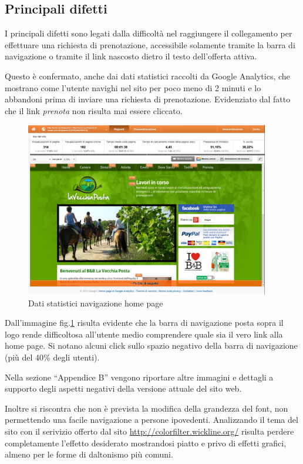 \documentclass[a4paper,12pt,hidelinks]{report}
\begin{document}
\subsection{Principali difetti}
  I principali difetti sono legati dalla difficoltà nel raggiungere il collegamento per effettuare una richiesta di prenotazione, accessibile 
  solamente tramite la barra di navigazione o tramite il link nascosto dietro il testo dell'offerta attiva.
  \par Questo è confermato, anche dai dati statistici raccolti da Google Analytics, che mostrano come l'utente navighi nel sito per poco meno di 2 minuti e 
  lo abbandoni prima di inviare una richiesta di prenotazione. Evidenziato dal fatto che il link \textit{prenota} non risulta mai essere cliccato.
  \begin{figure}[h!]%
    \includegraphics[width=0.95\textwidth,keepaspectratio=true]{img/googleAnalyticsDoc1}
    \centering
    \caption{Dati statistici navigazione home page}%
    \label{fig:googleHomePage}%
  \end{figure}
  Dall'immagine fig.\ref{fig:googleHomePage} risulta evidente che la barra di navigazione posta sopra il logo rende difficoltosa all'utente medio comprendere 
  quale sia il vero link alla home page. Si notano alcuni click sullo spazio negativo della barra di navigazione (più del 40\% degli utenti).
  \par Nella sezione ``Appendice B'' vengono riportare altre immagini e dettagli a supporto degli aspetti negativi della versione attuale 
  del sito web.
  \par Inoltre si riscontra che non è prevista la modifica della grandezza del font, non permettendo una facile navigazione a persone ipovedenti. 
  Analizzando il tema del sito con il serivizio offerto dal sito \url{http://colorfilter.wickline.org/} risulta perdere completamente l'effetto desiderato mostrandosi piatto 
  e privo di effetti grafici, almeno per le forme di daltonismo più comuni.
\end{document}
